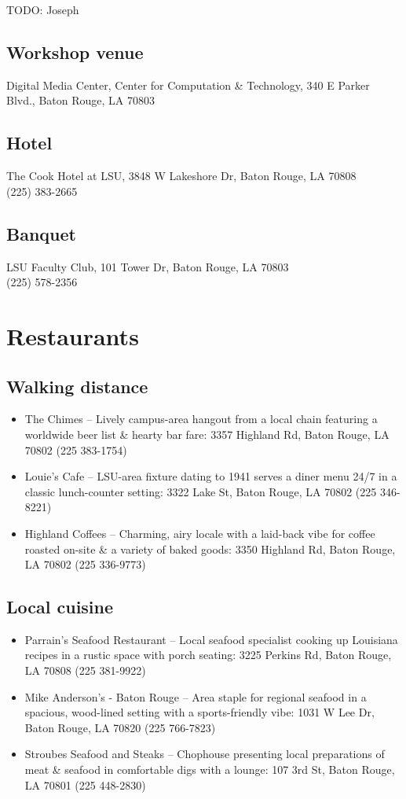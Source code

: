 \documentclass[12pt,letterpaper]{book}
\begin{document}
TODO: Joseph

\subsection*{Workshop venue}
Digital Media Center, Center for Computation \& Technology, 340 E Parker Blvd., Baton Rouge, LA 70803
\subsection*{Hotel}
The Cook Hotel at LSU, 3848 W Lakeshore Dr, Baton Rouge, LA 70808 \\
(225) 383-2665
\subsection*{Banquet}
LSU Faculty Club, 101 Tower Dr, Baton Rouge, LA 70803 \\
(225) 578-2356

\section{Restaurants}

\subsection*{Walking distance}

\begin{itemize}
\item The Chimes -- Lively campus-area hangout from a local chain featuring a worldwide beer list \& hearty bar fare: 3357 Highland Rd, Baton Rouge, LA 70802 (225 383-1754)
\item Louie's Cafe -- LSU-area fixture dating to 1941 serves a diner menu 24/7 in a classic lunch-counter setting: 3322 Lake St, Baton Rouge, LA 70802 (225 346-8221)
\item Highland Coffees -- Charming, airy locale with a laid-back vibe for coffee roasted on-site \& a variety of baked goods: 3350 Highland Rd, Baton Rouge, LA 70802 (225 336-9773)
\end{itemize}

\subsection*{Local cuisine}

\begin{itemize}
\item Parrain's Seafood Restaurant -- Local seafood specialist cooking up Louisiana recipes in a rustic space with porch seating: 3225 Perkins Rd, Baton Rouge, LA 70808 (225 381-9922)
\item Mike Anderson's - Baton Rouge -- Area staple for regional seafood in a spacious, wood-lined setting with a sports-friendly vibe: 1031 W Lee Dr, Baton Rouge, LA 70820 (225 766-7823)
\item Stroubes Seafood and Steaks -- Chophouse presenting local preparations of meat \& seafood in comfortable digs with a lounge: 107 3rd St, Baton Rouge, LA 70801 (225 448-2830)
\end{itemize}


\backmatter
\renewcommand{\indexname}{Author Index}
\printindex
\vspace{2cm}
\doclicenseThis 
\end{document}
